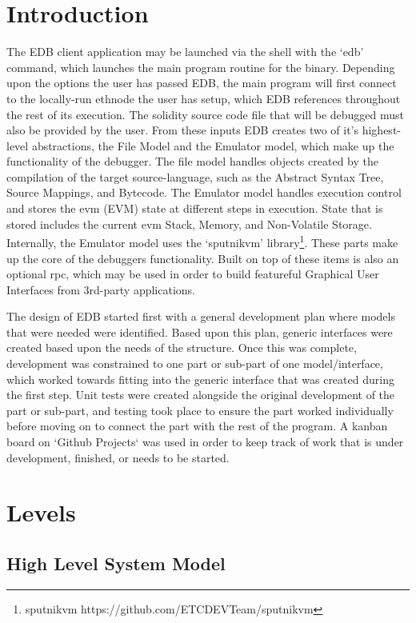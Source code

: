 \documentclass{report}
\begin{document}
\section{Introduction}
    The EDB client application may be launched via the shell with the `edb' command, which launches the main program routine for the binary. Depending upon the options the user has passed EDB, the main program will first connect to the locally-run \Gls{ethnode} the user has setup, which EDB references throughout the rest of its execution. The \gls{solidity} source code file that will be debugged must also be provided by the user. From these inputs EDB creates two of it's highest-level abstractions, the File Model and the Emulator model, which make up the functionality of the debugger. The file model handles objects created by the compilation of the target source-language, such as the Abstract Syntax Tree, Source Mappings, and Bytecode. The Emulator model handles execution control and stores the \Gls{evm} (EVM) state at different steps in execution. State that is stored includes the current \Gls{evm} Stack, Memory, and Non-Volatile Storage. Internally, the Emulator model uses the `sputnikvm' library\footnote{sputnikvm https://github.com/ETCDEVTeam/sputnikvm}. These parts make up the core of the debuggers functionality. Built on top of these items is also an optional \Gls{rpc}, which may be used in order to build featureful Graphical User Interfaces from 3rd-party applications.

    The design of EDB started first with a general development plan where models that were needed were identified. Based upon this plan, generic interfaces were created based upon the needs of the structure. Once this was complete, development was constrained to one part or sub-part of one model/interface, which worked towards fitting into the generic interface that was created during the first step. Unit tests were created alongside the original development of the part or sub-part, and testing took place to ensure the part worked individually before moving on to connect the part with the rest of the program. A kanban board on `Github Projects` was used in order to keep track of work that is under development, finished, or needs to be started.

\section{Levels}
\subsection{High Level System Model}
\end{document}
